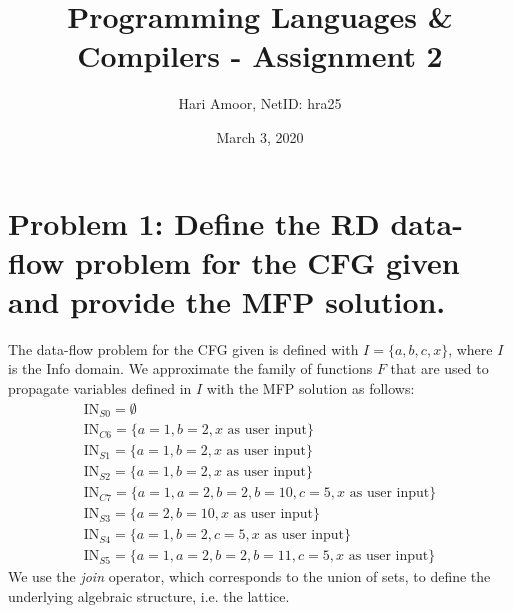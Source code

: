\documentclass[12pt]{article}
\title{Programming Languages \& Compilers - Assignment 2}
\author{Hari Amoor, NetID: hra25}
\date{March 3, 2020}
\begin{document}
\maketitle

\section*{Problem 1: Define the RD data-flow problem for the CFG given and provide the MFP solution.}
The data-flow problem for the CFG given is defined with $I = \{a, b, c, x\}$, where $I$ is the Info domain. We approximate the family of functions $F$ that are used to propagate variables defined in $I$ with the MFP solution as follows:
\begin{align*}
  \text{IN}_{S0} = \emptyset \nonumber \\
  \text{IN}_{C6} = \{a = 1, b = 2, x \text{ as user input}\} \nonumber \\
  \text{IN}_{S1} = \{a = 1, b = 2, x \text{ as user input}\} \nonumber \\
  \text{IN}_{S2} = \{a = 1, b = 2, x \text{ as user input}\} \nonumber \\
  \text{IN}_{C7} = \{a = 1, a = 2, b = 2, b = 10, c = 5, x \text{ as user input}\} \nonumber \\
  \text{IN}_{S3} = \{a = 2, b = 10, x \text{ as user input}\} \nonumber \\
  \text{IN}_{S4} = \{a = 1, b = 2, c = 5, x \text{ as user input}\} \nonumber \\
  \text{IN}_{S5} = \{a = 1, a = 2, b = 2, b = 11, c = 5, x \text{ as user input}\} \nonumber
\end{align*}
We use the \textit{join} operator, which corresponds to the union of sets, to define the underlying algebraic structure, i.e. the lattice.
\end{document}
